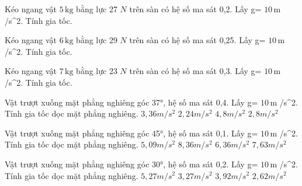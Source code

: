 \begin{bt}
Kéo ngang vật $5\,\text{kg}$ bằng lực 27 $N$ trên sàn có hệ số ma sát 0,2. Lấy g= $10\,\text{m}$ /s^2. Tính gia tốc.
\end{bt}

\begin{bt}
Kéo ngang vật $6\,\text{kg}$ bằng lực 29 $N$ trên sàn có hệ số ma sát 0,25. Lấy g= $10\,\text{m}$ /s^2. Tính gia tốc.
\end{bt}

\begin{bt}
Kéo ngang vật $7\,\text{kg}$ bằng lực 23 $N$ trên sàn có hệ số ma sát 0,3. Lấy g= $10\,\text{m}$ /s^2. Tính gia tốc.
\end{bt}

\begin{ex}
Vật trượt xuống mặt phẳng nghiêng góc 37°, hệ số ma sát 0,4. Lấy g= $10\,\text{m}$ /s^2. Tính gia tốc dọc mặt phẳng nghiêng.
\choice
{$3,36 m/s^2$}
{$2,24 m/s^2$}
{$4,8 m/s^2$}
{\True $2,8 m/s^2$}
\end{ex}

\begin{ex}
Vật trượt xuống mặt phẳng nghiêng góc 45°, hệ số ma sát 0,1. Lấy g= $10\,\text{m}$ /s^2. Tính gia tốc dọc mặt phẳng nghiêng.
\choice
{$5,09 m/s^2$}
{$8,36 m/s^2$}
{\True $6,36 m/s^2$}
{$7,63 m/s^2$}
\end{ex}

\begin{ex}
Vật trượt xuống mặt phẳng nghiêng góc 30°, hệ số ma sát 0,2. Lấy g= $10\,\text{m}$ /s^2. Tính gia tốc dọc mặt phẳng nghiêng.
\choice
{$5,27 m/s^2$}
{\True $3,27 m/s^2$}
{$3,92 m/s^2$}
{$2,62 m/s^2$}
\end{ex}

